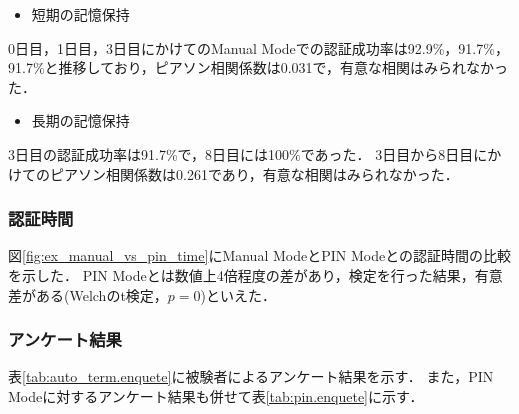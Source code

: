 \begin{itemize}
  \item 短期の記憶保持
\end{itemize}
0日目，1日目，3日目にかけてのManual Modeでの認証成功率は92.9\%，91.7\%，91.7\%と推移しており，ピアソン相関係数は0.031で，有意な相関はみられなかった．

\begin{itemize}
  \item 長期の記憶保持
\end{itemize}
3日目の認証成功率は91.7\%で，8日目には100\%であった．
3日目から8日目にかけてのピアソン相関係数は0.261であり，有意な相関はみられなかった．

\subsubsection{認証時間}
図\ref{fig:ex_manual_vs_pin_time}にManual ModeとPIN Modeとの認証時間の比較を示した．
PIN Modeとは数値上4倍程度の差があり，検定を行った結果，有意差がある(Welchのt検定，$ p = 0 $)といえた．

\subsubsection{アンケート結果}
表\ref{tab:auto_term.enquete}に被験者によるアンケート結果を示す．
また，PIN Modeに対するアンケート結果も併せて表\ref{tab:pin.enquete}に示す．

